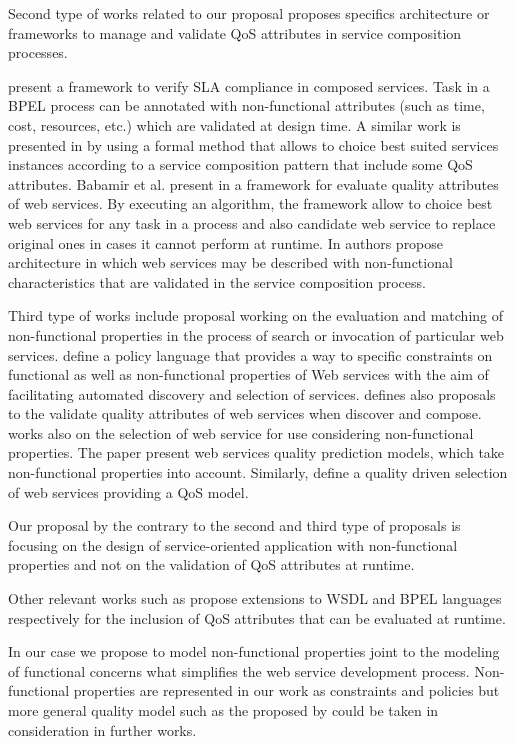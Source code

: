 Second type of works related to our proposal proposes specifics architecture or frameworks to manage and validate QoS attributes in service composition processes. 

\cite{XiaoCZBOLH08} present a framework to verify SLA compliance in composed services. Task in a BPEL process can be annotated with non-functional attributes (such as time, cost, resources, etc.) which are validated at design time. A similar work is presented in \cite{SchmelingCM11} by using a formal method that allows to choice best suited services instances according to a service composition pattern that include some QoS attributes. Babamir et al. present in \cite{Babamir2010} a framework for evaluate quality attributes of web services. By executing an algorithm, the framework allow to choice best web services for any task in a process and also candidate web service to replace original ones in cases it cannot perform at runtime. In \cite{Karunamurthy2012787} authors propose architecture in which web services may be described with non-functional characteristics that are validated in the service composition process.

Third type of works include proposal working on the evaluation and matching of non-functional properties in the process of search or invocation of particular web services.\cite{AgarwalLS09} define a policy language that provides a way to specific constraints on functional as well as non-functional properties of Web services with the aim of facilitating automated discovery and selection of services.\cite{JeongCL09,Kamalabad2012} defines also proposals to the validate quality attributes of web services when discover and compose.\cite{MohantyRP10} works also on the selection of web service for use considering non-functional properties. The paper present web services quality prediction models, which take non-functional properties into account. Similarly, \cite{Yeom2006} define a quality driven selection of web services providing a QoS model.

Our proposal by the contrary to the second and third type of proposals is focusing on the design of service-oriented application with non-functional properties and not on the validation of QoS attributes at runtime.

Other relevant works such as \cite{DAmbrogio06,Liu20121080} propose extensions to WSDL and BPEL languages respectively for the inclusion of QoS attributes that can be evaluated at runtime.


In our case we propose to model non-functional properties joint to the modeling of functional concerns what simplifies the web service development process. Non-functional properties are represented in our work as constraints and policies but more general quality model such as the proposed by \cite{Goeb2011,Klass2009} could be taken in consideration in further works.

